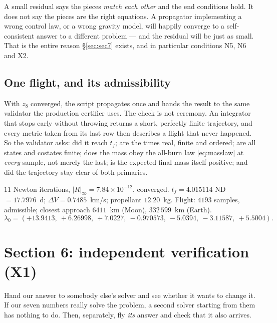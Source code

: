 \documentclass[11pt]{article}
\newcommand{\tf}{t_f}\newcommand{\R}{\mathbb{R}}
\begin{document}
\begin{warn}
A small residual says the pieces \emph{match each other} and the end conditions
hold. It does not say the pieces are the right equations. A propagator
implementing a wrong control law, or a wrong gravity model, will happily
converge to a self-consistent answer to a different problem --- and the residual
will be just as small. That is the entire reason \S\ref{sec:sec7} exists, and
in particular conditions N5, N6 and X2.
\end{warn}

\subsection{One flight, and its admissibility}

\begin{intu}
With $z_8$ converged, the script propagates once and hands the result to the
same validator the production certifier uses. The check is not ceremony. An
integrator that stops early without throwing returns a short, perfectly finite
trajectory, and every metric taken from its last row then describes a flight
that never happened. So the validator asks: did it reach $\tf$; are the times
real, finite and ordered; are all states and costates finite; does the mass obey
the all-burn law \eqref{eq:masslaw} at \emph{every} sample, not merely the last;
is the expected final mass itself positive; and did the trajectory stay clear of
both primaries.
\end{intu}

\begin{ran}
$11$ Newton iterations, $|R|_\infty = 7.84\times10^{-12}$, converged.
$\tf = 4.015114$ ND $= 17.7976$~d; $\Delta V = 0.7485$~km/s; propellant
$12.20$~kg. Flight: $4193$ samples, admissible; closest approach $6411$~km
(Moon), $332\,599$~km (Earth).
\[
\lambda_0 = (+13.9413,\ +6.26998,\ +7.0227,\ -0.970573,\ -5.0394,\ -3.11587,\ +5.5004).
\]
\end{ran}

\section{Section 6: independent verification (X1)}\label{sec:sec6}

\begin{eli}
Hand our answer to somebody else's solver and see whether it wants to change
it. If our seven numbers really solve the problem, a second solver starting
from them has nothing to do. Then, separately, fly \emph{its} answer and check
that it also arrives.
\end{eli}
\end{document}
